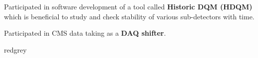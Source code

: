 \documentclass{beamer}
\begin{document}
\begin{frame}
\begin{center}
\begin{itemize}
{\item Participated in software development of a tool called {\bf Historic DQM (HDQM)} which is beneficial to study and check stability of various sub-detectors with time.
\vspace{0.8mm}
\item Participated in CMS data taking as a {\bf DAQ shifter}.\\}
\end{itemize}
\vspace{-3.5mm}
\hspace*{80mm}\begin{beamercolorbox}[wd=28mm,ht=3.mm,center,shadow=true, rounded=true]{redgrey}
{}
{ {}}
\end{beamercolorbox}
\end{center}
\end{frame}

\begin{frame}
\begin{center}
\vspace{13mm}
\textbf{\Large{}}
\end{center}
\end{frame}
\end{document}
